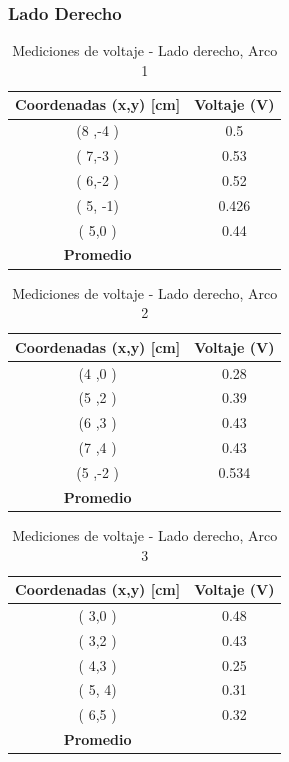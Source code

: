 \documentclass[11pt,twocolumn]{article}
\begin{document}
\subsubsection*{Lado Derecho}

\begin{table}[h]
\centering
\caption{Mediciones de voltaje - Lado derecho, Arco 1}
\begin{tabular}{cc}
\toprule
\textbf{Coordenadas (x,y) [cm]} & \textbf{Voltaje (V)} \\
\midrule
(8 ,-4 ) & 0.5 \\
( 7,-3 ) & 0.53 \\
( 6,-2 ) & 0.52 \\
( 5, -1) &  0.426\\
( 5,0 ) & 0.44 \\
\midrule
\textbf{Promedio} &  \\
\bottomrule
\end{tabular}
\end{table}

\begin{table}[h]
\centering
\caption{Mediciones de voltaje - Lado derecho, Arco 2}
\begin{tabular}{cc}
\toprule
\textbf{Coordenadas (x,y) [cm]} & \textbf{Voltaje (V)} \\
\midrule
(4 ,0 ) & 0.28 \\
(5 ,2 ) &  0.39\\
(6 ,3 ) &  0.43\\
(7 ,4 ) &  0.43\\
(5 ,-2 ) & 0.534 \\
\midrule
\textbf{Promedio} &  \\
\bottomrule
\end{tabular}
\end{table}

\begin{table}[h]
\centering
\caption{Mediciones de voltaje - Lado derecho, Arco 3}
\begin{tabular}{cc}
\toprule
\textbf{Coordenadas (x,y) [cm]} & \textbf{Voltaje (V)} \\
\midrule
( 3,0 ) &  0.48\\
( 3,2 ) &  0.43\\
( 4,3 ) &  0.25\\
( 5, 4) &  0.31\\
( 6,5 ) & 0.32 \\
\midrule
\textbf{Promedio} &  \\
\bottomrule
\end{tabular}
\end{table}
\end{document}

